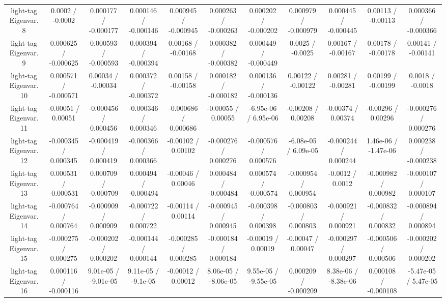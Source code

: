 \begin{table}[htbp]
\begin{center}
\begin{tabular}{|c|c|c|c|c|c|c|c|c|c|c|}
  light-tag Eigenvar. 8 & 0.0002 / -0.0002 & 0.000177 / -0.000177 & 0.000146 / -0.000146 & 0.000945 / -0.000945 & 0.000263 / -0.000263 & 0.000202 / -0.000202 & 0.000979 / -0.000979 & 0.000445 / -0.000445 & 0.00113 / -0.00113 & 0.000366 / -0.000366 \\ 
  light-tag Eigenvar. 9 & 0.000625 / -0.000625 & 0.000593 / -0.000593 & 0.000394 / -0.000394 & 0.00168 / -0.00168 & 0.000382 / -0.000382 & 0.000449 / -0.000449 & 0.0025 / -0.0025 & 0.00167 / -0.00167 & 0.00178 / -0.00178 & 0.00141 / -0.00141 \\ 
  light-tag Eigenvar. 10 & 0.000571 / -0.000571 & 0.00034 / -0.00034 & 0.000372 / -0.000372 & 0.00158 / -0.00158 & 0.000182 / -0.000182 & 0.000136 / -0.000136 & 0.00122 / -0.00122 & 0.00281 / -0.00281 & 0.00199 / -0.00199 & 0.0018 / -0.0018 \\ 
  light-tag Eigenvar. 11 & -0.00051 / 0.00051 & -0.000456 / 0.000456 & -0.000346 / 0.000346 & -0.000686 / 0.000686 & -0.00055 / 0.00055 & -6.95e-06 / 6.95e-06 & -0.00208 / 0.00208 & -0.00374 / 0.00374 & -0.00296 / 0.00296 & -0.000276 / 0.000276 \\ 
  light-tag Eigenvar. 12 & -0.000345 / 0.000345 & -0.000419 / 0.000419 & -0.000366 / 0.000366 & -0.00102 / 0.00102 & -0.000276 / 0.000276 & -0.000576 / 0.000576 & -6.08e-05 / 6.09e-05 & -0.000244 / 0.000244 & 1.46e-06 / -1.47e-06 & 0.000238 / -0.000238 \\ 
  light-tag Eigenvar. 13 & 0.000531 / -0.000531 & 0.000709 / -0.000709 & 0.000494 / -0.000494 & -0.00046 / 0.00046 & 0.000484 / -0.000484 & 0.000574 / -0.000574 & -0.000954 / 0.000954 & -0.0012 / 0.0012 & -0.000982 / 0.000982 & -0.000107 / 0.000107 \\ 
  light-tag Eigenvar. 14 & -0.000764 / 0.000764 & -0.000909 / 0.000909 & -0.000722 / 0.000722 & -0.00114 / 0.00114 & -0.000945 / 0.000945 & -0.000398 / 0.000398 & -0.000803 / 0.000803 & -0.000921 / 0.000921 & -0.000832 / 0.000832 & -0.000894 / 0.000894 \\ 
  light-tag Eigenvar. 15 & -0.000275 / 0.000275 & -0.000202 / 0.000202 & -0.000144 / 0.000144 & -0.000285 / 0.000285 & -0.000184 / 0.000184 & -0.00019 / 0.00019 & -0.00047 / 0.00047 & -0.000297 / 0.000297 & -0.000506 / 0.000506 & -0.000202 / 0.000202 \\ 
  light-tag Eigenvar. 16 & 0.000116 / -0.000116 & 9.01e-05 / -9.01e-05 & 9.11e-05 / -9.1e-05 & -0.00012 / 0.00012 & 8.06e-05 / -8.06e-05 & 9.55e-05 / -9.55e-05 & 0.000209 / -0.000209 & 8.38e-06 / -8.38e-06 & 0.000108 / -0.000108 & -5.47e-05 / 5.47e-05 \\ 

\end{tabular}
\end{center}
\end{table}
